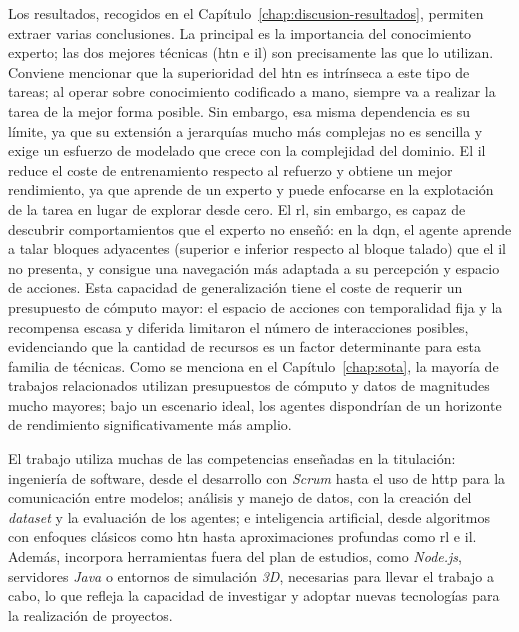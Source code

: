 Los resultados, recogidos en el Capítulo~\ref{chap:discusion-resultados}, permiten extraer
varias conclusiones. La principal es la importancia del conocimiento experto; 
las dos mejores técnicas (\gls{htn} e \gls{il}) son precisamente las que lo utilizan. 
Conviene mencionar que la superioridad del \gls{htn} es intrínseca a este tipo de tareas; al operar sobre conocimiento codificado a mano, siempre va a realizar la tarea de la mejor forma posible. Sin embargo, esa misma dependencia es su límite, ya que su extensión a jerarquías mucho más complejas no es sencilla y exige un esfuerzo de modelado que crece con la complejidad del dominio.
El \gls{il} reduce el coste de entrenamiento respecto al
refuerzo y obtiene un mejor rendimiento, ya que aprende de un experto y puede enfocarse en la
explotación de la tarea en lugar de explorar desde cero. El \gls{rl}, sin embargo, es capaz
de descubrir comportamientos que el experto no enseñó: en la \gls{dqn}, el agente aprende a
talar bloques adyacentes (superior e inferior respecto al bloque talado) 
que el \gls{il} no presenta, y consigue una
navegación más adaptada a su percepción y espacio de acciones. Esta capacidad de
generalización tiene el coste de requerir un presupuesto de cómputo mayor: el espacio
de acciones con temporalidad fija y la recompensa escasa y diferida limitaron el
número de interacciones posibles, evidenciando que la cantidad de recursos es un factor
determinante para esta familia de técnicas. Como se menciona en el
Capítulo~\ref{chap:sota}, la mayoría de trabajos relacionados utilizan presupuestos de
cómputo y datos de magnitudes mucho mayores; bajo un escenario ideal, los agentes
dispondrían de un horizonte de rendimiento significativamente más amplio.

El trabajo utiliza muchas de las competencias enseñadas en la titulación: ingeniería de software,
desde el desarrollo con \textit{Scrum} hasta el uso de \acrshort{http} para la comunicación entre modelos; 
análisis y manejo de datos, con la creación del \textit{dataset} y la
evaluación de los agentes; e inteligencia artificial, desde algoritmos con enfoques clásicos como
\gls{htn} hasta aproximaciones profundas como \gls{rl} e \gls{il}. 
Además, incorpora herramientas fuera del plan de estudios, como
\textit{Node.js}, servidores \textit{Java} o entornos de simulación \textit{3D},
necesarias para llevar el trabajo a cabo, lo que refleja la capacidad de investigar
y adoptar nuevas tecnologías para la realización de proyectos.

